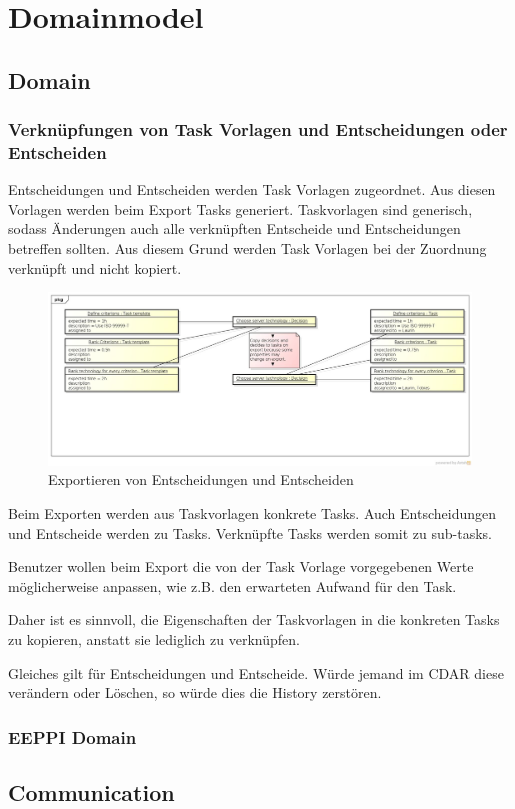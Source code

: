 	\section{Domainmodel} 
		\subsection{Domain}
		
			\subsubsection{Verknüpfungen von Task Vorlagen und Entscheidungen oder Entscheiden}			
				Entscheidungen und Entscheiden werden Task Vorlagen zugeordnet. Aus diesen Vorlagen werden beim Export Tasks generiert. Taskvorlagen sind generisch, sodass Änderungen auch alle verknüpften Entscheide und Entscheidungen betreffen sollten. Aus diesem Grund werden Task Vorlagen bei der Zuordnung verknüpft und nicht kopiert.
				
				\begin{figure}[H]
					\includegraphics[width=\textwidth]{architecture/media/img/DecisionTaskRelation.jpg}
					\centering
					\caption{Exportieren von Entscheidungen und Entscheiden}
					\label{fig:DecisionTaskRelation}
				\end{figure}
				
				Beim Exporten werden aus Taskvorlagen konkrete Tasks. Auch Entscheidungen und Entscheide werden zu Tasks. Verknüpfte Tasks werden somit zu sub-tasks.
				
				Benutzer wollen beim Export die von der Task Vorlage vorgegebenen Werte möglicherweise anpassen, wie z.B. den erwarteten Aufwand für den Task.

				Daher ist es sinnvoll, die Eigenschaften der Taskvorlagen in die konkreten Tasks zu kopieren, anstatt sie lediglich zu verknüpfen.
				
				Gleiches gilt für Entscheidungen und Entscheide. Würde jemand im CDAR diese verändern oder Löschen, so würde dies die History zerstören.
				
			
			\subsubsection{EEPPI Domain}
			
				
		
		\subsection{Communication}
